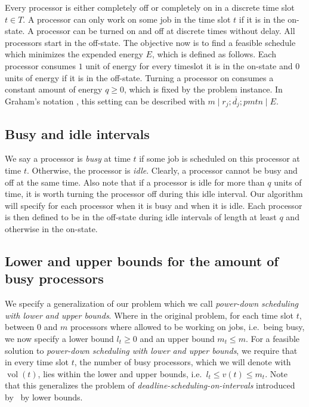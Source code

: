 \documentclass[a4paper]{article}
\DeclareMathOperator{\vol}{vol}
\begin{document}
Every processor is either completely off or completely on in a discrete time slot $t \in T$.
A processor can only work on some job in the time slot $t$ if it is in the on-state.
A processor can be turned on and off at discrete times without delay.
All processors start in the off-state.
The objective now is to find a feasible schedule which minimizes the expended energy $E$, which is defined as follows.
Each processor consumes $1$ unit of energy for every timeslot it is in the on-state and $0$ units of energy if it is in the off-state.
Turning a processor on consumes a constant amount of energy $q \geq 0$, which is fixed by the problem instance.
In Graham's notation \citep{graham}, this setting can be described with $m \mid r_j; \overline{d_j}; pmtn \mid E$.

\subsection{Busy and idle intervals}
We say a processor is \emph{busy} at time $t$ if some job is scheduled on this processor at time $t$.
Otherwise, the processor is \emph{idle}.
Clearly, a processor cannot be busy and off at the same time.
Also note that if a processor is idle for more than $q$ units of time, it is worth turning the processor off during this idle interval.
Our algorithm will specify for each processor when it is busy and when it is idle.
Each processor is then defined to be in the off-state during idle intervals of length at least $q$ and otherwise in the on-state.

\subsection{Lower and upper bounds for the amount of busy processors}
We specify a generalization of our problem which we call \emph{power-down scheduling with lower and upper bounds}.
Where in the original problem, for each time slot $t$, between $0$ and $m$ processors where allowed to be working on jobs, i.e.\ being busy, we now specify a lower bound $l_t \geq 0$ and an upper bound $m_t \leq m$. 
For a feasible solution to \emph{power-down scheduling with lower and upper bounds}, we require that in every time slot $t$, the number of busy processors, which we will denote with $\vol(t)$, lies within the lower and upper bounds, i.e.\ $l_t \leq v(t) \leq m_t$.
Note that this generalizes the problem of \emph{deadline-scheduling-on-intervals} introduced by~\cite{antoniadis} by lower bounds.
\end{document}
